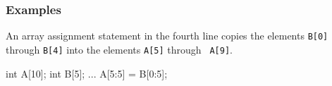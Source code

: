 \subsubsection*{Examples}

An array assignment statement in the fourth line copies the elements
{\tt B[0]} through {\tt B[4]} into the elements {\tt A[5]} through {\tt
A[9]}.

\hspace{\hsize}
\begin{XCexample}
int A[10];
int B[5];
    ...
A[5:5] = B[0:5]; 
\end{XCexample}











